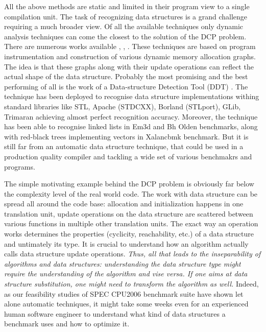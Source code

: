 \begin{description}[style=unboxed,leftmargin=0cm]
\quad All the above methods are static and limited in their program view to a single compilation unit. The task of recognizing data structures is a grand challenge requiring a much broader view. Of all the available techniques only dynamic analysis techniques can come the closest to the solution of the DCP problem. There are numerous works available \cite{Rupprecht:2017:DID:3155562.3155607}\cite{Haller:2016:SDS:2938006.2938029}, \cite{Haller:2016:SDS:2938006.2938029}, \cite{Rupprecht:2017:DID:3155562.3155607}. These techniques are based on program instrumentation and construction of various dynamic memory allocation graphs. The idea is that these graphs along with their update operations can reflect the actual shape of the data structure. Probably the most promising and the best performing of all is the work of a Data-structure Detection Tool (DDT) \cite{1669122}. The technique has been deployed to recognise data structure implementations withing standard libraries like STL, Apache (STDCXX), Borland (STLport), GLib, Trimaran achieving almost perfect recognition accuracy. Moreover, the technique has been able to recognise linked lists in Em3d and Bh Olden benchmarks, along with red-black trees implementing vectors in Xalancbmk benchmark. But it is still far from an automatic data structure technique, that could be used in a production quality compiler and tackling a wide set of various benchmakrs and programs.
\item[Real world code complexity level] The simple motivating example behind the DCP problem is obviously far below the complexity level of the real world code. The work with data structure can be spread all around the code base: allocation and initialization happens in one translation unit, update operations on the data structure are scattered between various functions in multiple other translation units. The exact way an operation works determines the properties (cyclicity, reachability, etc.) of a data structure and untimately its type. It is crucial to understand how an algorithm actually calls data structure update operations. \textit{Thus, all that leads to the inseparability of algorithms and data structures: understanding the data structure type might require the understanding of the algorithm and vise versa. If one aims at data structure substitution, one might need to transform the algorithm as well.} Indeed, as our feasibility studies of SPEC CPU2006 benchmark suite have shown let alone automatic techniques, it might take some weeks even for an experienced human software engineer to understand what kind of data structures a benchmark uses and how to optimize it.
\end{description}
